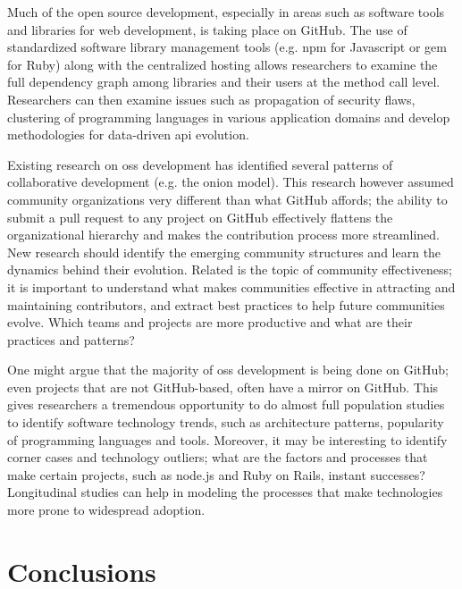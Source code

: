 \documentclass{sig-alternate}
\begin{document}
 Much of the open source development,
especially in areas such as software tools and libraries for web development, is
taking place on GitHub. The use of standardized software library management
tools (e.g. \textsf{npm} for Javascript or \textsf{gem} for Ruby) along with the
centralized hosting allows researchers to examine the full dependency graph
among libraries and their users at the method call level. Researchers can then
examine issues such as propagation of security flaws, clustering of programming
languages in various application domains and develop methodologies for
data-driven {\sc api} evolution.

 Existing research on \textsf{oss}
development has identified several patterns of collaborative development
(e.g. the onion model). This research however assumed community organizations
very different than what GitHub affords; the ability to submit a pull request
to any project on GitHub effectively flattens the organizational hierarchy and
makes the contribution process more streamlined. New research should identify
the emerging community structures and learn the dynamics behind their
evolution. Related is the topic of community effectiveness; it is important to
understand what makes communities effective in attracting and maintaining
contributors, and extract best practices to help future communities
evolve. Which teams and projects are more productive and what are their
practices and patterns?

 One might argue that the majority of
{\sc oss} development is being done on GitHub; even projects that are not
GitHub-based, often have a mirror on GitHub. This gives researchers a tremendous
opportunity to do almost full population studies to identify software technology
trends, such as architecture patterns, popularity of programming languages and
tools. Moreover, it may be interesting to identify corner cases and technology
outliers; what are the factors and processes that make certain projects, such
as \textsf{node.js} and Ruby on Rails, instant successes? Longitudinal studies
can help in modeling the processes that make technologies more prone to
widespread adoption.

\section{Conclusions}
\end{document}
